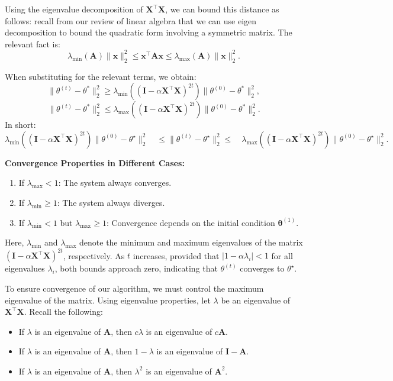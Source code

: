 Using the eigenvalue decomposition of \(\boldsymbol{X}^\top \boldsymbol{X}\), we can bound this distance as follows: recall from our review of linear algebra that we can use eigen decomposition to bound the quadratic form involving a symmetric matrix. The relevant fact is:
\[
    \lambda_{\min}(\boldsymbol{A})\|\boldsymbol{x}\|_2^2 \leq \boldsymbol{x}^\top\boldsymbol{A}\boldsymbol{x} \leq \lambda_{\max}(\boldsymbol{A})\|\boldsymbol{x}\|_2^2.
\]

When substituting for the relevant terms, we obtain:
\[
    \|\theta^{(t)} - \theta^{*}\|_{2}^{2} \geq \lambda_{\min}((\mathbf{I} - \alpha \mathbf{X}^{\top} \mathbf{X})^{2t}) \|\theta^{(0)} - \theta^{*}\|_{2}^{2},
\]
\[
    \|\theta^{(t)} - \theta^{*}\|_{2}^{2} \leq \lambda_{\max}((\mathbf{I} - \alpha \mathbf{X}^{\top} \mathbf{X})^{2t}) \|\theta^{(0)} - \theta^{*}\|_{2}^{2}.
\]
In short:
\[
    \lambda_{\min}((\mathbf{I} - \alpha \boldsymbol{X}^\top \boldsymbol{X})^{2t}) \|\theta^{(0)} - \theta^\star\|_2^2 \quad \leq \|\theta^{(t)} - \theta^\star\|_2^2  \leq \quad \lambda_{\max}((\mathbf{I} - \alpha \boldsymbol{X}^\top \boldsymbol{X})^{2t}) \|\theta^{(0)} - \theta^\star\|_2^2.
\]

\textbf{Convergence Properties in Different Cases:}
\begin{enumerate}
    \item If \(\lambda_{\max} < 1\): The system always converges.
    \item If \(\lambda_{\min} \geq 1\): The system always diverges.
    \item If \(\lambda_{\min} < 1\) but \(\lambda_{\max} \geq 1\): Convergence depends on the initial condition \(\boldsymbol{\theta}^{(1)}\).
\end{enumerate}



Here, \(\lambda_{\min}\) and \(\lambda_{\max}\) denote the minimum and maximum eigenvalues of the matrix \((\mathbf{I} - \alpha \boldsymbol{X}^\top \boldsymbol{X})^{2t}\), respectively. As \(t\) increases, provided that \(|1 - \alpha \lambda_i| < 1\) for all eigenvalues \(\lambda_i\), both bounds approach zero, indicating that \(\theta^{(t)}\) converges to \(\theta^\star\).


To ensure convergence of our algorithm, we must control the maximum eigenvalue of the matrix. Using eigenvalue properties, let \(\lambda\) be an eigenvalue of \(\mathbf{X}^\top \mathbf{X}\). Recall the following:
\begin{itemize}
    \item If \(\lambda\) is an eigenvalue of \(\mathbf{A}\), then \(c\lambda\) is an eigenvalue of \(c\mathbf{A}\).
    \item If \(\lambda\) is an eigenvalue of \(\mathbf{A}\), then \(1 - \lambda\) is an eigenvalue of \(\mathbf{I} - \mathbf{A}\).
    \item If \(\lambda\) is an eigenvalue of \(\mathbf{A}\), then \(\lambda^2\) is an eigenvalue of \(\mathbf{A}^2\).
\end{itemize}

